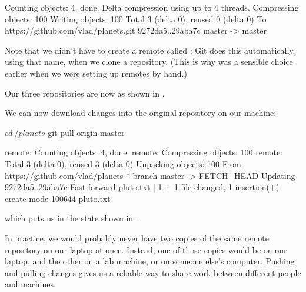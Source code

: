 \begin{VerbOut}
Counting objects: 4, done.
Delta compression using up to 4 threads.
Compressing objects: 100%
Writing objects: 100%
Total 3 (delta 0), reused 0 (delta 0)
To https://github.com/vlad/planets.git
   9272da5..29aba7c  master -> master
\end{VerbOut}

Note that we didn't have to create a remote called : Git
does this automatically, using that name, when we clone a repository.
(This is why  was a sensible choice earlier when we were
setting up remotes by hand.)

Our three repositories are now as shown in .


We can now download changes into the original repository on our machine:

\begin{VerbIn}
$ cd ~/planets
$ git pull origin master
\end{VerbIn}

\begin{VerbOut}
remote: Counting objects: 4, done.
remote: Compressing objects: 100%
remote: Total 3 (delta 0), reused 3 (delta 0)
Unpacking objects: 100%
From https://github.com/vlad/planets
 * branch            master     -> FETCH_HEAD
Updating 9272da5..29aba7c
Fast-forward
 pluto.txt | 1 +
 1 file changed, 1 insertion(+)
 create mode 100644 pluto.txt
\end{VerbOut}

which puts us in the state shown in .


In practice, we would probably never have two copies of the same remote
repository on our laptop at once. Instead, one of those copies would be
on our laptop, and the other on a lab machine, or on someone else's
computer. Pushing and pulling changes gives us a reliable way to share
work between different people and machines.

